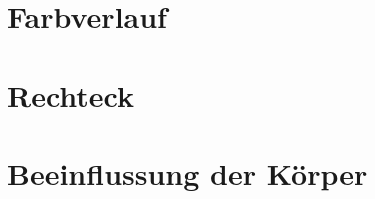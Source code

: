 \documentclass[parskip=full]{scrartcl}
\begin{document}
	\section{Farbverlauf}
		
	\section{Rechteck}
	
	\section{Beeinflussung der Körper}
	
\end{document}
